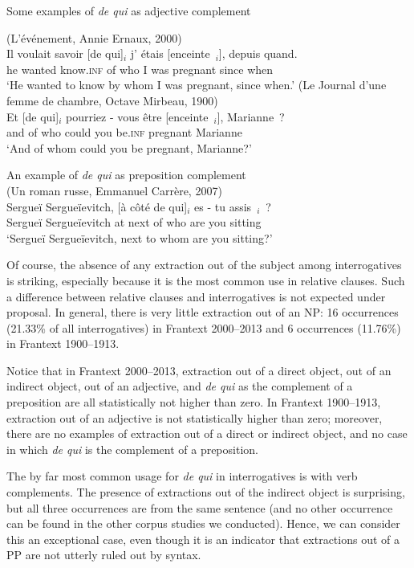 \begin{exe}
    \ex Some examples of \emph{de qui} as adjective complement \label{ex:dq2000-adjective-qu}
    \begin{xlist}
        \ex (L'événement, Annie Ernaux, 2000)\\
        \gll Il voulait savoir [de qui]$_i$ j' étais [enceinte~\trace{}$_i$], depuis quand.\\
he wanted know\textsc{.inf} of who I was pregnant since when\\
\glt `He wanted to know by whom I was pregnant, since when.'
\ex (Le Journal d'une femme de chambre, Octave Mirbeau, 1900)\\
\gll Et [de qui]$_i$ pourriez - vous être [enceinte~\trace{}$_i$], Marianne~?\\
and of who could {} you be\textsc{.inf} pregnant Marianne\\
\glt `And of whom could you be pregnant, Marianne?'
    \end{xlist}
\end{exe}
\pagebreak\largerpage[2]
\ea An example of \emph{de qui} as preposition complement\\
(Un roman russe, Emmanuel Carrère, 2007)\\
\gll Sergueï Sergueïevitch, [à côté de qui]$_i$ es - tu assis~\trace{}$_i$~?\\
Sergueï Sergueïevitch at next of who are {} you sitting\\
\glt `Sergueï Sergueïevitch, next to whom are you sitting?'
\label{ex:dq2000-prep-qu}
\z 

Of course, the absence of any extraction out of the subject among interrogatives is striking, especially because it is the most common use in relative clauses. Such a difference between relative clauses and interrogatives is not expected under  proposal. In general, there is very little extraction out of an NP: 16 occurrences (21.33\% of all interrogatives) in Frantext 2000--2013 and 6 occurrences (11.76\%) in Frantext 1900--1913.

Notice that in Frantext 2000--2013, extraction out of a direct object, out of an indirect object, out of an adjective, and \emph{de qui} as the complement of a preposition are all statistically not higher than zero. In Frantext 1900--1913, extraction out of an adjective is not statistically higher than zero; moreover, there are no examples of extraction out of a direct or indirect object, and no case in which \emph{de qui} is the complement of a preposition.

The by far most common usage for \emph{de qui} in interrogatives is with verb complements. The presence of extractions out of the indirect object is surprising, but all three occurrences are from the same sentence (and no other occurrence can be found in the other corpus studies we conducted). Hence, we can consider this an exceptional case, even though it is an indicator that extractions out of a PP are not utterly ruled out by syntax.
